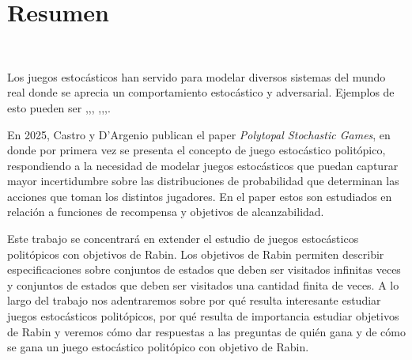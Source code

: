 \chapter*{Resumen}
~\label{abstract}
\vspace{-1cm}

Los juegos estocásticos han servido para modelar diversos sistemas del mundo
real donde se aprecia un comportamiento estocástico y adversarial. Ejemplos de
esto pueden ser ,,, ,,,.

En 2025, Castro y D'Argenio publican el paper \emph{Polytopal Stochastic
	Games}, en donde por primera vez se presenta el concepto de juego estocástico
politópico, respondiendo a la necesidad de modelar juegos estocásticos que
puedan capturar mayor incertidumbre sobre las distribuciones de probabilidad
que determinan las acciones que toman los distintos jugadores. En el paper
estos son estudiados en relación a funciones de recompensa y objetivos de
alcanzabilidad.

Este trabajo se concentrará en extender el estudio de juegos estocásticos
politópicos con objetivos de Rabin. Los objetivos de Rabin permiten describir
especificaciones sobre conjuntos de estados que deben ser visitados infinitas
veces y conjuntos de estados que deben ser visitados una cantidad finita de
veces. A lo largo del trabajo nos adentraremos sobre por qué resulta
interesante estudiar juegos estocásticos politópicos, por qué resulta de
importancia estudiar objetivos de Rabin y veremos cómo dar respuestas a las
preguntas de quién gana y de cómo se gana un juego estocástico politópico con
objetivo de Rabin.